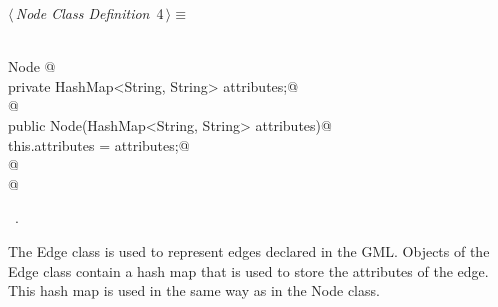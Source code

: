 \documentclass[a4paper]{report}
\begin{document}
\begin{flushleft} \small
\begin{minipage}{\linewidth}\label{scrap4}\raggedright\small
{} $\langle\,${\itshape Node Class Definition}\nobreak\ {\footnotesize {4}}$\,\rangle\equiv$
\vspace{-1ex}
\begin{list}{}{} \item
\mbox{}\verb@@\\
\mbox{}\verb@class Node {@\\
\mbox{}\verb@        private HashMap<String, String> attributes;@\\
\mbox{}\verb@        @\\
\mbox{}\verb@        public Node(HashMap<String, String> attributes){@\\
\mbox{}\verb@                this.attributes = attributes;@\\
\mbox{}\verb@        }@\\
\mbox{}\verb@}@\\
\mbox{}\verb@@{\NWsep}
\end{list}
\vspace{-1.5ex}
\footnotesize
\begin{list}{}{\setlength{\itemsep}{-\parsep}\setlength{\itemindent}{-\leftmargin}}
\item \NWtxtMacroRefIn\ .

\item{}
\end{list}
\end{minipage}\vspace{4ex}
\end{flushleft}
The Edge class is used to represent edges declared in the GML. Objects of the Edge class contain a hash map that is used to store the attributes of the edge. This hash map
is used in the same way as in the Node class.
\end{document}
